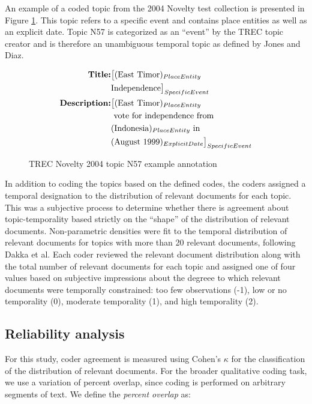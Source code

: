 \documentclass{sig-alternate}
\begin{document}
An example of a coded topic from the 2004 Novelty test collection is presented in Figure \ref{fig.example}.  This topic refers to a specific event and contains place entities as well as an explicit date.  Topic N57 is categorized as an ``event'' by the TREC topic creator and is therefore an unambiguous temporal topic as defined by Jones and Diaz.

\begin{figure}[!ht]
\begin{equation*}
\begin{split}
\mbox{\bf{Title}:} & \big[(\mbox{East Timor})_{PlaceEntity} \\
	& \mbox{Independence}\big]_{SpecificEvent} \\
\mbox{\bf{Description}:} & \big[  (\mbox{East Timor})_{PlaceEntity} \\
	& \mbox{ vote for independence from } \\
	& (\mbox{Indonesia})_{PlaceEntity} \mbox{ in } \\
	& (\mbox{August 1999})_{ExplicitDate}\big]_{SpecificEvent}
\end{split}
\end{equation*}
\caption{TREC Novelty 2004 topic N57 example annotation}
\label{fig.example}
\end{figure}

In addition to coding the topics based on the defined codes, the coders assigned a temporal designation to the distribution of relevant documents for each topic. This was a subjective process to determine whether there is agreement about topic-temporality based strictly on the ``shape'' of the distribution of relevant documents. Non-parametric densities were fit to the temporal distribution of relevant documents for topics with more than 20 relevant documents, following Dakka et al. Each coder reviewed the relevant document distribution along with the total number of relevant documents for each topic and assigned one of four values based on subjective impressions about the degreee to which relevant documents were temporally constrained:  too few observations (-1), low or no temporality (0), moderate temporality (1), and high temporality (2). 
\subsection{Reliability analysis}

For this study, coder agreement is measured using Cohen's $\kappa$ for the classification of the distribution of relevant documents. For the broader qualitative coding task, we use a variation of percent overlap, since coding is performed on arbitrary segments of text. We define the \emph{percent overlap} as:
\end{document}
